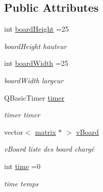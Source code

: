 \subsection*{Public Attributes}
\begin{DoxyCompactItemize}
\item 
int \hyperlink{class_board2_a00b3c1b6fd5563515ca765a2ee84adc8}{board\+Height} =25\hypertarget{class_board2_a00b3c1b6fd5563515ca765a2ee84adc8}{}\label{class_board2_a00b3c1b6fd5563515ca765a2ee84adc8}

\begin{DoxyCompactList}\small\item\em board\+Height hauteur \end{DoxyCompactList}\item 
int \hyperlink{class_board2_a45133885f7bb6a1030eb123aa527f60a}{board\+Width} =25\hypertarget{class_board2_a45133885f7bb6a1030eb123aa527f60a}{}\label{class_board2_a45133885f7bb6a1030eb123aa527f60a}

\begin{DoxyCompactList}\small\item\em board\+Width largeur \end{DoxyCompactList}\item 
Q\+Basic\+Timer \hyperlink{class_board2_a84422a4e581b5cf43a1a2b695908f247}{timer}\hypertarget{class_board2_a84422a4e581b5cf43a1a2b695908f247}{}\label{class_board2_a84422a4e581b5cf43a1a2b695908f247}

\begin{DoxyCompactList}\small\item\em timer timer \end{DoxyCompactList}\item 
vector$<$ \hyperlink{classmatrix}{matrix} $\ast$ $>$ \hyperlink{class_board2_a99c1dbd2ea704a00fa6768ccf6ec164b}{v\+Board}\hypertarget{class_board2_a99c1dbd2ea704a00fa6768ccf6ec164b}{}\label{class_board2_a99c1dbd2ea704a00fa6768ccf6ec164b}

\begin{DoxyCompactList}\small\item\em v\+Board liste des board chargé \end{DoxyCompactList}\item 
int \hyperlink{class_board2_a5b8680681af9477caa2213968a109d6d}{time} =0\hypertarget{class_board2_a5b8680681af9477caa2213968a109d6d}{}\label{class_board2_a5b8680681af9477caa2213968a109d6d}

\begin{DoxyCompactList}\small\item\em time temps \end{DoxyCompactList}\end{DoxyCompactItemize}


